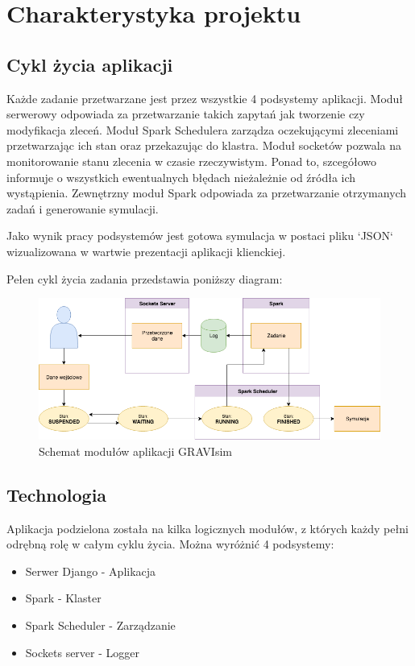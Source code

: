 \documentclass[a4paper,onecolumn,oneside,12pt]{memoir}
\begin{document}
{\chapter{Charakterystyka projektu}
\section{Cykl życia aplikacji}
\quad \quad Każde zadanie przetwarzane jest przez wszystkie 4 podsystemy aplikacji. Moduł serwerowy
odpowiada za przetwarzanie takich zapytań jak tworzenie czy modyfikacja zleceń.
Moduł Spark Schedulera zarządza oczekującymi zleceniami przetwarzając ich stan
oraz przekazując do klastra. Moduł socketów pozwala na monitorowanie stanu zlecenia
w czasie rzeczywistym. Ponad to, szcegółowo informuje o wszystkich ewentualnych błędach
nieżależnie od źródła ich wystąpienia. Zewnętrzny moduł Spark odpowiada za przetwarzanie
otrzymanych zadań i generowanie symulacji.

Jako wynik pracy podsystemów jest gotowa symulacja w postaci pliku `JSON` wizualizowana
w wartwie prezentacji aplikacji klienckiej.

Pełen cykl życia zadania przedstawia poniższy diagram:

\begin{figure}[h]
	\centering
	\includegraphics[width=1\linewidth]{lifecycle}
	\caption{Schemat modułów aplikacji GRAVIsim}
	\label{fig:stronaTytulowa}
\end{figure}

\section{Technologia}
\quad \quad Aplikacja podzielona została na kilka logicznych modułów, z których każdy pełni odrębną
rolę w całym cyklu życia. Można wyróżnić 4 podsystemy:
\begin{itemize}
\item Serwer Django - Aplikacja
\item Spark - Klaster
\item Spark Scheduler - Zarządzanie
\item Sockets server - Logger
\end{itemize}

}
\end{document}
